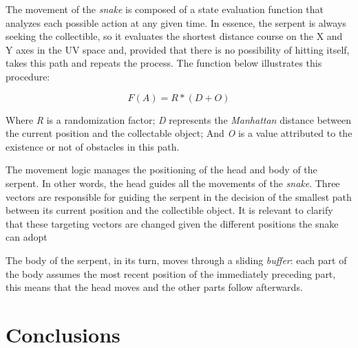 \documentclass[12pt]{article}
\begin{document}
The movement of the \textit{snake} is composed of a state evaluation function that analyzes each possible action at any given time. In essence, the serpent is always seeking  the collectible, so it evaluates the shortest distance course on the X and Y axes in the UV space and, provided that there is no possibility of hitting itself, takes this path and repeats the process. The function below illustrates this procedure:

\begin{equation}
F(A) = R * (D + O)
\label{equation11}
\end{equation}

Where \textit{R} is a randomization factor; \textit{D} represents the \textit{Manhattan} distance between the current position and the collectable object; And \textit{O} is a value attributed to the existence or not of obstacles in this path.

The movement logic manages the positioning of the head and body of the serpent.  In other words, the head guides all the movements of the \textit{snake}. Three vectors are  responsible for guiding the serpent in the decision of the smallest path between its current position and the collectible object. It is relevant to clarify that these targeting vectors are changed given the different positions the snake can adopt

The body of the serpent, in its turn, moves through a sliding \textit{buffer}: each part of the body assumes the most recent position of the immediately preceding part, this means that the head moves and the other parts follow afterwards.

\section{Conclusions}




\end{document}
